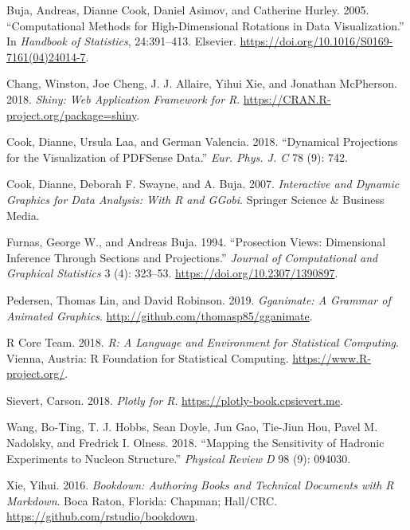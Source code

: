 \hypertarget{refs}{}
\leavevmode\hypertarget{ref-buja_computational_2005}{}%
Buja, Andreas, Dianne Cook, Daniel Asimov, and Catherine Hurley. 2005. ``Computational Methods for High-Dimensional Rotations in Data Visualization.'' In \emph{Handbook of Statistics}, 24:391--413. Elsevier. \url{https://doi.org/10.1016/S0169-7161(04)24014-7}.

\leavevmode\hypertarget{ref-chang_shiny:_2018}{}%
Chang, Winston, Joe Cheng, J. J. Allaire, Yihui Xie, and Jonathan McPherson. 2018. \emph{Shiny: Web Application Framework for R}. \url{https://CRAN.R-project.org/package=shiny}.

\leavevmode\hypertarget{ref-cook_dynamical_2018}{}%
Cook, Dianne, Ursula Laa, and German Valencia. 2018. ``Dynamical Projections for the Visualization of PDFSense Data.'' \emph{Eur. Phys. J. C} 78 (9): 742.

\leavevmode\hypertarget{ref-cook_interactive_2007}{}%
Cook, Dianne, Deborah F. Swayne, and A. Buja. 2007. \emph{Interactive and Dynamic Graphics for Data Analysis: With R and GGobi}. Springer Science \& Business Media.

\leavevmode\hypertarget{ref-furnas_prosection_1994}{}%
Furnas, George W., and Andreas Buja. 1994. ``Prosection Views: Dimensional Inference Through Sections and Projections.'' \emph{Journal of Computational and Graphical Statistics} 3 (4): 323--53. \url{https://doi.org/10.2307/1390897}.

\leavevmode\hypertarget{ref-pedersen_gganimate:_2019}{}%
Pedersen, Thomas Lin, and David Robinson. 2019. \emph{Gganimate: A Grammar of Animated Graphics}. \url{http://github.com/thomasp85/gganimate}.

\leavevmode\hypertarget{ref-r_core_team_r:_2018}{}%
R Core Team. 2018. \emph{R: A Language and Environment for Statistical Computing}. Vienna, Austria: R Foundation for Statistical Computing. \url{https://www.R-project.org/}.

\leavevmode\hypertarget{ref-sievert_plotly_2018}{}%
Sievert, Carson. 2018. \emph{Plotly for R}. \url{https://plotly-book.cpsievert.me}.

\leavevmode\hypertarget{ref-wang_mapping_2018}{}%
Wang, Bo-Ting, T. J. Hobbs, Sean Doyle, Jun Gao, Tie-Jiun Hou, Pavel M. Nadolsky, and Fredrick I. Olness. 2018. ``Mapping the Sensitivity of Hadronic Experiments to Nucleon Structure.'' \emph{Physical Review D} 98 (9): 094030.

\leavevmode\hypertarget{ref-xie_bookdown:_2016}{}%
Xie, Yihui. 2016. \emph{Bookdown: Authoring Books and Technical Documents with R Markdown}. Boca Raton, Florida: Chapman; Hall/CRC. \url{https://github.com/rstudio/bookdown}.

